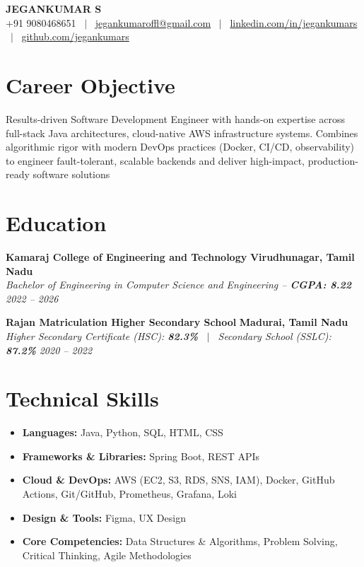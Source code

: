 \documentclass[10pt,letterpaper]{article}
\newcommand{\resumeSubheading}[4]{
  \vspace{2.5pt}
  \textbf{#1} \hfill \textbf{#2}\\
  \textit{#3} \hfill \textit{#4}\\
  \vspace{-1.5pt}
}
\begin{document}
\begin{center}
    {\Huge \textbf{JEGANKUMAR S}} \\[4pt]
    \small 
    +91 9080468651 \ $|$ \ 
    \href{mailto:jegankumaroffl@gmail.com}{jegankumaroffl@gmail.com} \ $|$ \ 
    \href{https://www.linkedin.com/in/jegankumars/}{linkedin.com/in/jegankumars} \ $|$ \ 
    \href{https://github.com/jegankumars}{github.com/jegankumars}
\end{center}
\vspace{-8pt}

\section{Career Objective}
\vspace{1pt}
\small{Results-driven Software Development Engineer with hands-on expertise across full-stack Java architectures, cloud-native AWS infrastructure systems. Combines algorithmic rigor with modern DevOps practices (Docker, CI/CD, observability) to engineer fault-tolerant, scalable backends and deliver high-impact, production-ready software solutions}

\section{Education}

\resumeSubheading
  {Kamaraj College of Engineering and Technology}{Virudhunagar, Tamil Nadu}
  {Bachelor of Engineering in Computer Science and Engineering -- \textbf{CGPA: 8.22}}{2022 -- 2026}

\resumeSubheading
  {Rajan Matriculation Higher Secondary School}{Madurai, Tamil Nadu}
  {Higher Secondary Certificate (HSC): \textbf{82.3\%} \ $|$ \ Secondary School (SSLC): \textbf{87.2\%}}{2020 -- 2022}

\section{Technical Skills}
\begin{itemize}[leftmargin=*, label={}, itemsep=1.5pt, topsep=1.5pt]
  \item \textbf{Languages:} Java, Python, SQL, HTML, CSS
  \item \textbf{Frameworks \& Libraries:} Spring Boot, REST APIs
  \item \textbf{Cloud \& DevOps:} AWS (EC2, S3, RDS, SNS, IAM), Docker, GitHub Actions, Git/GitHub, Prometheus, Grafana, Loki
  \item \textbf{Design \& Tools:} Figma, UX Design
  \item \textbf{Core Competencies:} Data Structures \& Algorithms, Problem Solving, Critical Thinking, Agile Methodologies
\end{itemize}
\end{document}
